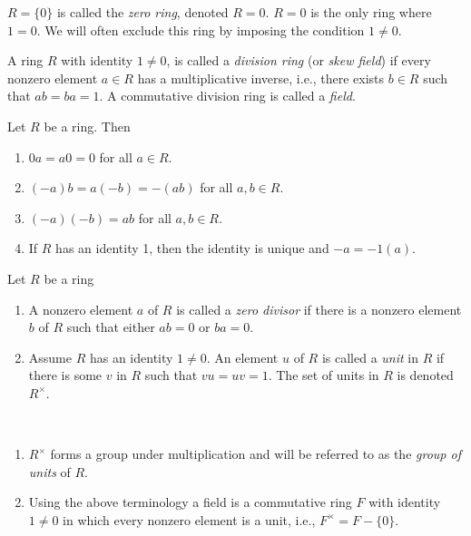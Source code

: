 \documentclass[../main]{subfiles}
\begin{document}
\begin{nt}
 $R = \{0\}$ is called the \textit{zero ring}, denoted $R = 0$. $R = 0$ is the only ring where $1 = 0$. We will often exclude this ring by imposing the condition $1 \neq 0$.
\end{nt}


\begin{dfn}
 A ring $R$ with identity $1 \neq 0$, is called a \textit{division ring} (or \textit{skew field}) if every nonzero element $a\in R$ has a multiplicative inverse, i.e., there exists $b\in R$ such that $ab = ba = 1$. A commutative division ring is called a \textit{field}.
\end{dfn}


\begin{prop}
 Let $R$ be a ring. Then 
 \begin{enumerate}
  \item $0a = a0 = 0$ for all $a \in R$.
  
  \item $(-a)b = a(-b) = -(ab)$ for all $a,b\in R$.
  
  \item $(-a)(-b) = ab$ for all $a,b\in R$.
  
  \item If $R$ has an identity 1, then the identity is unique and $-a = -1(a)$.
 \end{enumerate}
\end{prop}


\begin{dfn}
 Let $R$ be a ring 
 \begin{enumerate}
  \item A nonzero element $a$ of $R$ is called a \textit{zero divisor} if there is a nonzero element $b$ of $R$ such that either $ab = 0$ or $ba = 0$.
  
  \item Assume $R$ has an identity $1 \neq 0$. An element $u$ of $R$ is called a \textit{unit} in $R$ if there is some $v$ in $R$ such that $vu = uv = 1$. The set of units in $R$ is denoted $R^{\times}$.
 \end{enumerate}
\end{dfn}


\begin{nt}
 ~\begin{enumerate}
   \item $R^{\times}$ forms a group under multiplication and will be referred to as the \textit{group of units} of $R$.
   
   \item Using the above terminology a field is a commutative ring $F$ with identity $1 \neq 0$ in which every nonzero element is a unit, i.e., $F^{\times} = F - \{0\}$.
  \end{enumerate}
\end{nt}
\end{document}
